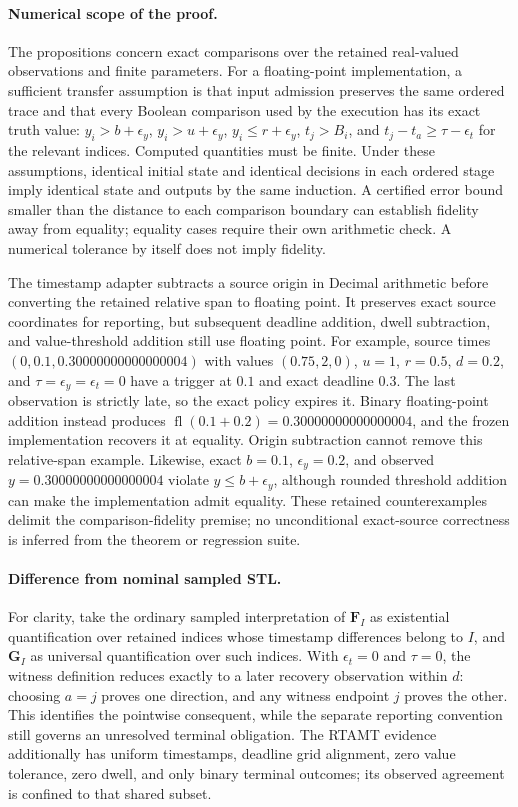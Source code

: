 \paragraph{Numerical scope of the proof.}
The propositions concern exact comparisons over the retained real-valued observations and finite parameters. For a floating-point implementation, a sufficient transfer assumption is that input admission preserves the same ordered trace and that every Boolean comparison used by the execution has its exact truth value: $y_i>b+\epsilon_y$, $y_i>u+\epsilon_y$, $y_i\leq r+\epsilon_y$, $t_j>B_i$, and $t_j-t_a\geq\tau-\epsilon_t$ for the relevant indices. Computed quantities must be finite. Under these assumptions, identical initial state and identical decisions in each ordered stage imply identical state and outputs by the same induction. A certified error bound smaller than the distance to each comparison boundary can establish fidelity away from equality; equality cases require their own arithmetic check. A numerical tolerance by itself does not imply fidelity.

The timestamp adapter subtracts a source origin in Decimal arithmetic before converting the retained relative span to floating point. It preserves exact source coordinates for reporting, but subsequent deadline addition, dwell subtraction, and value-threshold addition still use floating point. For example, source times $(0,0.1,0.30000000000000004)$ with values $(0.75,2,0)$, $u=1$, $r=0.5$, $d=0.2$, and $\tau=\epsilon_y=\epsilon_t=0$ have a trigger at $0.1$ and exact deadline $0.3$. The last observation is strictly late, so the exact policy expires it. Binary floating-point addition instead produces $\operatorname{fl}(0.1+0.2)=0.30000000000000004$, and the frozen implementation recovers it at equality. Origin subtraction cannot remove this relative-span example. Likewise, exact $b=0.1$, $\epsilon_y=0.2$, and observed $y=0.30000000000000004$ violate $y\leq b+\epsilon_y$, although rounded threshold addition can make the implementation admit equality. These retained counterexamples delimit the comparison-fidelity premise; no unconditional exact-source correctness is inferred from the theorem or regression suite.

\paragraph{Difference from nominal sampled STL.}
For clarity, take the ordinary sampled interpretation of $\mathbf{F}_I$ as existential quantification over retained indices whose timestamp differences belong to $I$, and $\mathbf{G}_I$ as universal quantification over such indices. With $\epsilon_t=0$ and $\tau=0$, the witness definition reduces exactly to a later recovery observation within $d$: choosing $a=j$ proves one direction, and any witness endpoint $j$ proves the other. This identifies the pointwise consequent, while the separate reporting convention still governs an unresolved terminal obligation. The RTAMT evidence additionally has uniform timestamps, deadline grid alignment, zero value tolerance, zero dwell, and only binary terminal outcomes; its observed agreement is confined to that shared subset.

